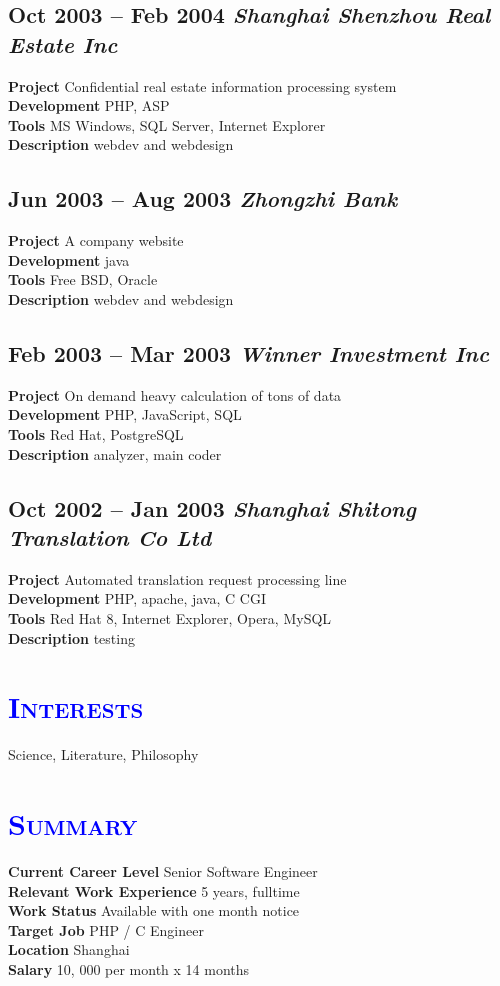 \documentclass[a4paper,12pt]{article}
\newcommand{\company}[1]{%
  \textsl{#1}}
\newcommand{\itembf}[1]{%
  \textbf{\textcolor{bfcolor}{#1}}}
\newcommand{\ssection}[1]{%
  \section[#1]{\normalsize\scshape\textcolor{blue}{#1}}}
\newcommand{\ssubsection}[1]{%
  \subsection[#1]{\normalsize\textbf #1}}
\begin{document}
	\ssubsection{Oct 2003 -- Feb 2004 \company{Shanghai Shenzhou Real Estate Inc}}
		\itembf{Project} Confidential real estate information processing system\\
		\itembf{Development} PHP, ASP\\
		\itembf{Tools} MS Windows, SQL Server, Internet Explorer\\
		\itembf{Description} webdev and webdesign

	\ssubsection{Jun 2003 -- Aug 2003 \company{Zhongzhi Bank}}
		\itembf{Project} A company website\\
		\itembf{Development} java\\
		\itembf{Tools} Free BSD, Oracle\\
		\itembf{Description} webdev and webdesign

	\ssubsection{Feb 2003 -- Mar 2003 \company{Winner Investment Inc}}
		\itembf{Project} On demand heavy calculation of tons of data\\
		\itembf{Development} PHP, JavaScript, SQL\\
		\itembf{Tools} Red Hat, PostgreSQL\\
		\itembf{Description} analyzer, main coder

	\ssubsection{Oct 2002 -- Jan 2003 \company{Shanghai Shitong Translation Co Ltd}}
		\itembf{Project} Automated translation request processing line\\
		\itembf{Development} PHP, apache, java, C CGI\\
		\itembf{Tools} Red Hat 8, Internet Explorer, Opera, MySQL\\
		\itembf{Description} testing


\ssection{Interests}
Science, Literature, Philosophy

\ssection{Summary}
\itembf{Current Career Level} Senior Software Engineer\\
\itembf{Relevant Work Experience} 5 years, fulltime\\
\itembf{Work Status} Available with one month notice\\
\itembf{Target Job} PHP / C Engineer\\
\itembf{Location} Shanghai\\
\itembf{Salary} 10, 000 per month x 14 months
\end{document}
